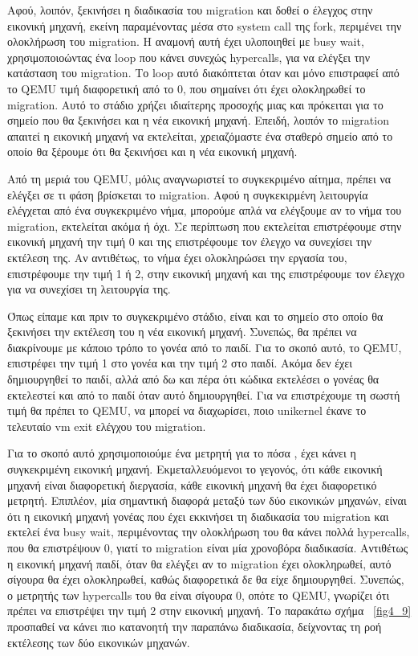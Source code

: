 Αφού, λοιπόν, ξεκινήσει η διαδικασία του migration και δοθεί ο έλεγχος στην
εικονική μηχανή, εκείνη παραμένοντας μέσα στο system call της fork, περιμένει
την ολοκλήρωση του migration. Η αναμονή αυτή έχει υλοποιηθεί με busy wait,
χρησιμοποιοώντας ένα loop που κάνει συνεχώς hypercalls, για να ελέγξει την
κατάσταση του migration. Το loop αυτό διακόπτεται όταν και μόνο επιστραφεί
από το QEMU τιμή διαφορετική από το 0, που σημαίνει ότι έχει ολοκληρωθεί το
migration. Αυτό το στάδιο χρήζει ιδιαίτερης προσοχής μιας και πρόκειται για το
σημείο που θα ξεκινήσει και η νέα εικονική μηχανή. Επειδή, λοιπόν το migration
απαιτεί η εικονική μηχανή να εκτελείται, χρειαζόμαστε ένα σταθερό σημείο από
το οποίο θα ξέρουμε ότι θα ξεκινήσει και η νέα εικονική μηχανή.

Από τη μεριά του QEMU, μόλις αναγνωριστεί το συγκεκριμένο αίτημα, πρέπει να
ελέγξει σε τι φάση βρίσκεται το migration. Αφού η συγκεκιρμένη λειτουργία
ελέγχεται από ένα συγκεκριμένο νήμα, μπορούμε απλά να ελέγξουμε αν το νήμα του
migration, εκτελείται ακόμα ή όχι. Σε περίπτωση που εκτελείται επιστρέφουμε στην
εικονική μηχανή την τιμή 0 και της επιστρέφουμε τον έλεγχο να συνεχίσει την
εκτέλεση της. Αν αντιθέτως, το νήμα έχει ολοκληρώσει την εργασία του,
επιστρέφουμε την τιμή 1 ή 2, στην εικονική μηχανή και της επιστρέφουμε τον
έλεγχο για να συνεχίσει τη λειτουργία της. 

Όπως είπαμε και πριν το συγκεκριμένο στάδιο, είναι και το σημείο στο οποίο θα
ξεκινήσει την εκτέλεση του η νέα εικονική μηχανή. Συνεπώς, θα πρέπει να
διακρίνουμε με κάποιο τρόπο το γονέα από το παιδί. Για το σκοπό αυτό, το QEMU,
επιστρέφει την τιμή 1 στο γονέα και την τιμή 2 στο παιδί. Ακόμα δεν έχει
δημιουργηθεί το παιδί, αλλά από δω και πέρα ότι κώδικα εκτελέσει ο γονέας θα
εκτελεστεί και από το παιδί όταν αυτό δημιουργηθεί. Για να επιστρέχουμε τη σωστή
τιμή θα πρέπει το QEMU, να μπορεί να διαχωρίσει, ποιο unikernel έκανε το
τελευταίο vm exit ελέγχου του migration. 

Για το σκοπό αυτό χρησιμοποιούμε ένα μετρητή για το πόσα , έχει κάνει
η συγκεκριμένη εικονική μηχανή. Εκμεταλλευόμενοι το γεγονός, ότι κάθε εικονική
μηχανή είναι διαφορετική διεργασία, κάθε εικονική μηχανή θα έχει διαφορετικό
μετρητή. Επιπλέον, μία σημαντική διαφορά μεταξύ των δύο εικονικών μηχανών, είναι
ότι η εικονική μηχανή γονέας που έχει εκκινήσει τη διαδικασία του migration και
εκτελεί ένα busy wait, περιμένοντας την ολοκλήρωση του θα κάνει πολλά
hypercalls, που θα επιστρέψουν 0, γιατί το migration είναι μία χρονοβόρα
διαδικασία. Αντιθέτως η εικονική μηχανή παιδί, όταν θα ελέγξει αν το migration
έχει ολοκληρωθεί, αυτό σίγουρα θα έχει ολοκληρωθεί, καθώς διαφορετικά δε θα είχε
δημιουργηθεί. Συνεπώς, ο μετρητής των hypercalls του θα είναι σίγουρα 0, οπότε
το QEMU, γνωρίζει ότι πρέπει να επιστρέψει την τιμή 2 στην εικονική μηχανή. Το
παρακάτω σχήμα ~\ref{fig4_9} προσπαθεί να κάνει πιο κατανοητή την παραπάνω
διαδικασία, δείχνοντας τη ροή εκτέλεσης των δύο εικονικών μηχανών.  

